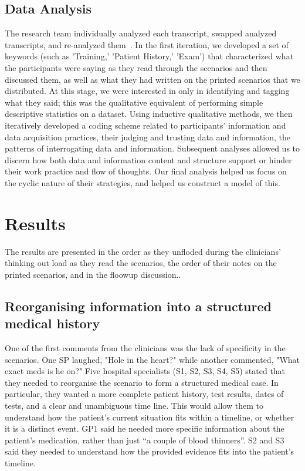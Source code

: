 \documentclass{sigchi}
\begin{document}
\subsection{Data Analysis}
The research team individually analyzed each transcript, swapped analyzed transcripts, and re-analyzed them~\cite{pope2000qualitative}.  In the first iteration, we developed a set of keywords (such as 'Training,' 'Patient History,' 'Exam') that characterized what the participants were saying as they read through the scenarios and then discussed them, as well as what they had written on the printed scenarios that we distributed. At this stage, we were interested in only in identifying and tagging what they said; this was the qualitative equivalent of performing simple descriptive statistics on a dataset.  Using inductive qualitative methods, \cite{corbin2014basics} we then iteratively developed a coding scheme related to participants' information and data acquisition practices, their judging and trusting data and information, the patterns of interrogating data and information. Subsequent analyses allowed us to discern how both data and information content and structure support or hinder their work practice and flow of thoughts.  Our final analysis helped us focus on the cyclic nature of their strategies, and helped us construct a model of this.


\section{Results}

The results are presented in the order as they unfloded during the clinicians' thinking out load as they read the scenarios, the order of their notes on the printed scenarios, and in the floowup discussion..
    
\subsection{Reorganising information into a structured medical history}
One of the first comments from the clinicians was the lack of specificity in the scenarios.  One SP laughed, "Hole in the heart?" while another commented, "What exact meds is he on?"  Five hospital specialists (S1, S2, S3, S4, S5) stated that they needed to reorganise the scenario to form a structured medical case. In particular, they wanted a more complete patient history, test results, dates of tests, and a clear and unambiguous time line.  This would allow them to understand how the patient's current situation  fits within a timeline, or whether it is a distinct event. GP1 said he needed more specific information about the patient's medication, rather than just ``a couple of blood thinners''. S2 and S3 said they needed to understand how the provided evidence fits into the patient's timeline.
\end{document}
